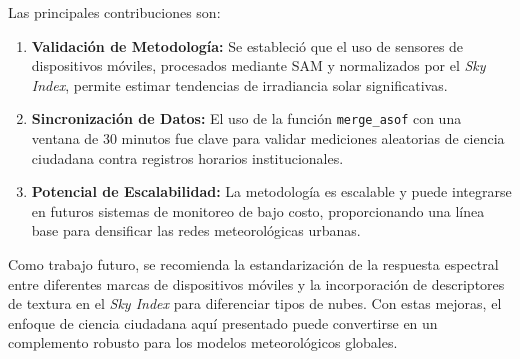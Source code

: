 \documentclass[twocolumn]{aastex701}
\begin{document}
Las principales contribuciones son:
\begin{enumerate}
    \item \textbf{Validación de Metodología:} Se estableció que el uso de sensores de dispositivos móviles, procesados mediante SAM y normalizados por el \textit{Sky Index}, permite estimar tendencias de irradiancia solar significativas.
    \item \textbf{Sincronización de Datos:} El uso de la función \texttt{merge\_asof} con una ventana de 30 minutos fue clave para validar mediciones aleatorias de ciencia ciudadana contra registros horarios institucionales.
    \item \textbf{Potencial de Escalabilidad:} La metodología es escalable y puede integrarse en futuros sistemas de monitoreo de bajo costo, proporcionando una línea base para densificar las redes meteorológicas urbanas.
\end{enumerate}

Como trabajo futuro, se recomienda la estandarización de la respuesta espectral entre diferentes marcas de dispositivos móviles y la incorporación de descriptores de textura en el \textit{Sky Index} para diferenciar tipos de nubes. Con estas mejoras, el enfoque de ciencia ciudadana aquí presentado puede convertirse en un complemento robusto para los modelos meteorológicos globales.

\renewcommand{\refname}{REFERENCIAS}
\renewcommand{\bibname}{REFERENCIAS}



\end{document}
